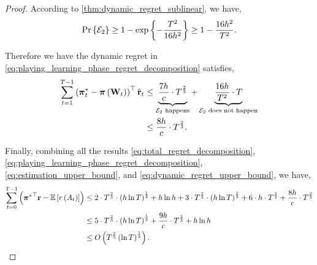 \begin{proof}
According to \cref{thm:dynamic_regret_sublinear}, we have,
\begin{equation*}
    {\text{Pr}}\left\{ {\mathcal{E}}_2 \right\} \ge 1 - \exp\left\{ - \frac{T^2}{16 h^2} \right\} \ge 1 - \frac{16 h^2}{T^2}.
\end{equation*}

Therefore we have the dynamic regret in \cref{eq:playing_learning_phase_regret_decomposition} satisfies,
\begin{equation}
\label{eq:dynamic_regret_upper_bound}
\begin{split}
    \sum\limits_{t=1}^{T-1}{ \left(  {{\boldsymbol{\pi}}_t^*} - {\boldsymbol{\pi}}\left( {\mathbf{W}}_t \right) \right)^\top \hat{{\mathbf{r}}}_t } &\le \underbrace{ \frac{7 h}{c} \cdot  T^{\frac{2}{3}} }_{ {\mathcal{E}}_2 \text{ happens}} + \underbrace{ \frac{16 h}{T^2} \cdot T }_{ {\mathcal{E}}_2 \text{ does not happen}} \\
    &\le \frac{8 h}{c} \cdot  T^{\frac{2}{3}}.
\end{split}
\end{equation}

Finally, combining all the results \cref{eq:total_regret_decomposition}, \cref{eq:playing_learning_phase_regret_decomposition}, \cref{eq:estimation_upper_bound}, and \cref{eq:dynamic_regret_upper_bound}, we have,
\begin{equation*}
\begin{split}
    \sum\limits_{t=0}^{T-1}{ \left( {{\boldsymbol{\pi}}^*}^\top {\mathbf{r}} - {\mathbb{E}} \left[ r\left(A_t\right) \right] \right) } &\le 2 \cdot T^{\frac{2}{3}} \cdot \left( h \ln{T} \right)^{\frac{1}{3}} + h \ln{h} + 3 \cdot T^{\frac{2}{3}} \cdot \left( h \ln{T} \right) ^\frac{1}{3} + 6 \cdot h \cdot T^{\frac{2}{3}} + \frac{8 h}{c} \cdot  T^{\frac{2}{3}} \\
    &\le 5 \cdot T^{\frac{2}{3}} \cdot \left( h \ln{T} \right)^{\frac{1}{3}} + \frac{9 h}{c} \cdot  T^{\frac{2}{3}} + h \ln{h} \\
    &\le O\left(T^{\frac{2}{3}}\left( \ln{T} \right)^{\frac{1}{3}}\right). \qedhere
\end{split}
\end{equation*}
\end{proof}

